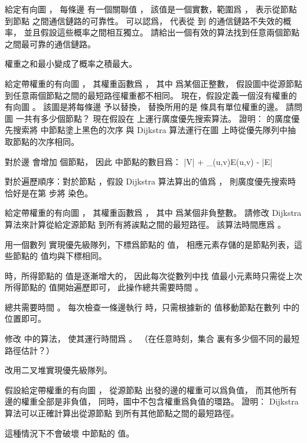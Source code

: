 \startANSWER
{}
\stopANSWER

\startEXERCISE
給定有向圖 ，
每條邊  有一個關聯值 ，
該值是一個實數，範圍爲 ，
表示從節點  到節點  之間通信鏈路的可靠性。
可以認爲，  代表從  到  的通信鏈路不失效的概率，
並且假設這些概率之間相互獨立。
請給出一個有效的算法找到任意兩個節點之間最可靠的通信鏈路。
\stopEXERCISE

\startANSWER
權重之和最小變成了概率之積最大。
\stopANSWER

\startEXERCISE
給定帶權重的有向圖 ，
其權重函數爲 ，
其中  爲某個正整數，
假設圖中從源節點  到任意兩個節點之間的最短路徑權重都不相同。
現在，假設定義一個沒有權重的有向圖 。
該圖是將每條邊  予以替換，
替換所用的是  條具有單位權重的邊。
請問圖  一共有多少個節點？
現在假設在  上運行廣度優先搜索算法。
證明：  的廣度優先搜索將  中節點塗上黑色的次序
與 Dijkstra 算法運行在圖  上時從優先隊列中抽取節點的次序相同。
\stopEXERCISE

\startANSWER
對於邊  會增加  個節點，
因此  中節點的數目爲：
\startformula
|V| + \sum_{(u,v)\in E}\omega(u,v) - |E|
\stopformula

對於遍歷順序：對於節點 ，假設 Dijkstra 算法算出的值爲 ，
則廣度優先搜索時恰好是在第  步將  染色。
\stopANSWER

\startEXERCISE[exercise:24.3-8]
給定帶權重的有向圖 ，
其權重函數爲 ，
其中  爲某個非負整數。
請修改 Dijkstra 算法來計算從給定源節點  到所有將誒點之間的最短路徑。
該算法時間應爲 。
\stopEXERCISE

\startANSWER
用一個數列  實現優先級隊列，下標爲節點的  值，
相應元素存儲的是節點列表，這些節點的  值均與下標相同。

 時，所得節點的  值是逐漸增大的，
因此每次從數列中找  值最小元素時只需從上次所得節點的  值開始遍歷即可，
此操作總共需要時間 。

 總共需要時間 。
每次檢查一條邊執行  時，只需根據新的  值移動節點在數列  中的位置即可。
\stopANSWER

\startEXERCISE
修改 中的算法，
使其運行時間爲 。
（\hint 在任意時刻，集合  裏有多少個不同的最短路徑估計？）
\stopEXERCISE

\startANSWER
改用二叉堆實現優先級隊列。
\stopANSWER

\startEXERCISE
假設給定帶權重的有向圖 ，
從源節點  出發的邊的權重可以爲負值，
而其他所有邊的權重全部是非負值，
同時，圖中不包含權重爲負值的環路。
證明： Dijkstra 算法可以正確計算出從源節點  到所有其他節點之間的最短路徑。
\stopEXERCISE

\startANSWER
這種情況下不會破壞  中節點的  值。
\stopANSWER

\stopsection
